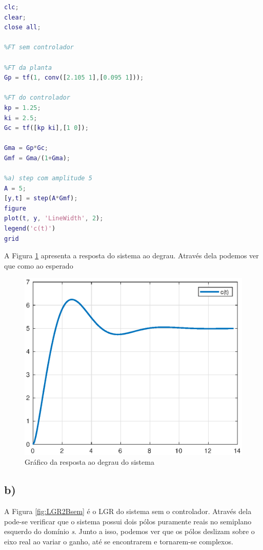     \begin{lstlisting}[language=Matlab,label=Q2A,caption=Análise da estabilidade]
clc;
clear;
close all;

%FT sem controlador

%FT da planta
Gp = tf(1, conv([2.105 1],[0.095 1]));

%FT do controlador
kp = 1.25;
ki = 2.5;
Gc = tf([kp ki],[1 0]);

Gma = Gp*Gc;
Gmf = Gma/(1+Gma);

%a) step com amplitude 5
A = 5;
[y,t] = step(A*Gmf);
figure
plot(t, y, 'LineWidth', 2);
legend('c(t)')
grid
    \end{lstlisting}

    A Figura \ref{fig:Q2A} apresenta a resposta do sistema ao degrau.  Através dela podemos ver que como ao esperado

    \begin{figure}[!ht]
        \centering
        \includegraphics[width = 0.75\linewidth]{Figuras/ProblemasPI/Problema2/step.eps}
        \caption{Gráfico da resposta ao degrau do sistema}
        \label{fig:Q2A}                   
    \end{figure}



\newpage
\subsection*{b) }

    A Figura \ref{fig:LGR2Bsem} é o LGR do sistema sem o controlador. Através dela pode-se verificar que
    o sistema possui dois pólos puramente reais no semiplano esquerdo do domínio \textit{s}. Junto a isso,
    podemos ver que os pólos deslizam sobre o eixo real ao variar o ganho, até se encontrarem e 
    tornarem-se complexos.
    
